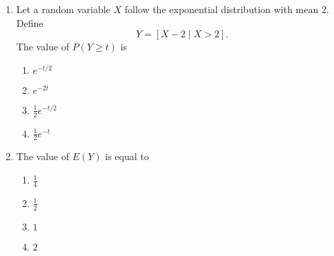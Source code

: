 \documentclass[journal]{IEEEtran}
\numberwithin{equation}{enumi}
\numberwithin{figure}{enumi}
\begin{document}
\begin{enumerate}
\item
Let a random variable $X$ follow the exponential distribution with mean 2. Define
\[
Y = [X - 2 \mid X > 2].
\]
The value of $P(Y \geq t)$ is
\hfill{}
\begin{multicols}{2}
\begin{enumerate}
    \item $e^{-t/2}$
    \item $e^{-2t}$
    \item $\frac{1}{2} e^{-t/2}$
    \item $\frac{1}{2} e^{-t}$
\end{enumerate}
\end{multicols}

\item
The value of $E(Y)$ is equal to
\hfill{}
\begin{multicols}{4}
\begin{enumerate}
    \item $\frac{1}{4}$
    \item $\frac{1}{2}$
    \item $1$
    \item $2$
\end{enumerate}
\end{multicols}


\end{enumerate}
\end{document}
